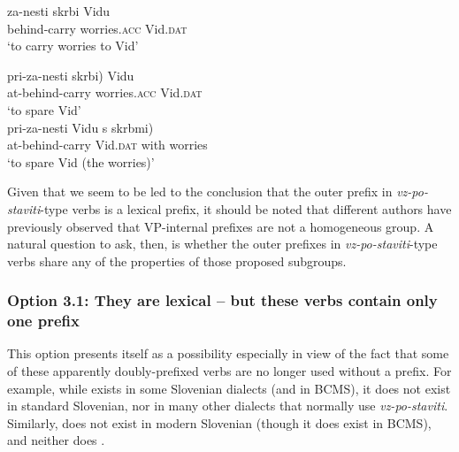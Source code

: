 \documentclass[output=paper,colorlinks,citecolor=brown]{langscibook}
\begin{document}
\begin{comment}
  \ea %
   \ea \gll za-nesti \minsp{\{} skrbi Vidu / \minsp{*} Vidu \minsp{(} s skrbmi)\} \\
   behind-carry {} worries.\textsc{acc} Vid.\textsc{dat} {} {} Vid.\textsc{dat} {} with worries \\
 \glt  `to carry worries to Vid'\\
  \ex  \gll  pri-za-nesti \minsp{\{(*} skrbi) Vidu / Vidu \minsp{(} s skrbmi)\}\\
   at-behind-carry {} worries.\textsc{acc} Vid.\textsc{dat} {} Vid.\textsc{dat} {} with worries\\
 \glt  `to spare Vid the worries'\\
\z   \z
\end{comment}
\ea %
\ea \gll za-nesti  skrbi Vidu  \\
   behind-carry worries.\textsc{acc} Vid.\textsc{dat}   \\
 \glt  `to carry worries to Vid'\\
\z   \z


\ea \label{ex:prizanesti2} \ea \gll pri-za-nesti \minsp{(*} skrbi) Vidu \\
    at-behind-carry {} worries.\textsc{acc} Vid.\textsc{dat}  \\
 \glt  `to spare Vid'\\
  \ex  \gll  pri-za-nesti  Vidu \minsp{(} s skrbmi)\\
   at-behind-carry  Vid.\textsc{dat} {} with worries\\
 \glt  `to spare Vid (the worries)'\\
\z   \z
  
\noindent Given that we seem to be led to the conclusion that the outer prefix in \textit{vz-po-staviti}-type verbs is a lexical prefix, it should be noted that different authors have previously observed that VP-internal prefixes are not a homogeneous group. A natural question to ask, then, is whether the outer prefixes in \textit{vz-po-staviti}-type verbs share any of the properties of those proposed subgroups.  



\subsubsection{Option 3.1: They are lexical -- but these verbs contain only one prefix}\label{sec:4.2.1}
This option presents itself as a possibility especially in view of the fact that some of these apparently doubly-prefixed verbs are no longer used without a prefix. For example, while  exists in some Slovenian dialects (and in BCMS), it does not exist in standard Slovenian, nor in many other dialects that normally use \textit{vz-po-staviti}. Similarly,  does not exist in modern Slovenian (though it does exist in BCMS), and neither does .
\end{document}

